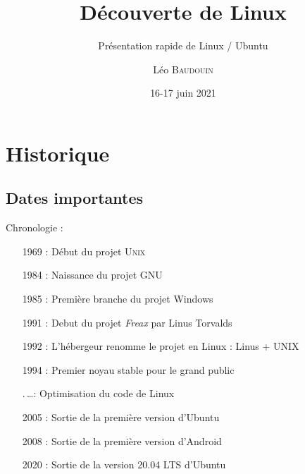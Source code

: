 \documentclass{beamer}
\title[Pr\'esentation Linux]{D\'ecouverte de Linux}
\subtitle{Présentation rapide de Linux / Ubuntu}
\author{L\'eo \textsc{Baudouin}}
\institute{
  {\url{baudouin.leo @ gmail.com}}
}
\date{16-17 juin 2021}
\begin{document}
\begin{frame}
\titlepage
\end{frame}

\begin{frame}
\tableofcontents
\end{frame}


\section{Historique}
\subsection{Dates importantes}
\begin{frame}
  \begin{block}{Chronologie :}
   ~~~~\begin{minipage}{\linewidth}
      \begin{itemize}
      \item[1969 :] Début du projet U\textsc{nix}
      \item[1984 :] Naissance du projet GNU
      \item[1985 :] Première branche du projet Windows
      \item[1991 :] Debut du projet \textit{Freax} par Linus Torvalds
      \item[1992 :] L'h\'ebergeur renomme le projet en Linux : Linus + UNIX
      \item[1994 :] Premier noyau stable pour le grand public
      \item[.\,\dots :] Optimisation du code de Linux
      \item[2005 :] Sortie de la première version d'Ubuntu
      \item[2008 :] Sortie de la première version d'Android
      \item[2020 :] Sortie de la version 20.04 LTS d'Ubuntu
      \end{itemize}
    \end{minipage}
  \end{block}
\end{frame}
\end{document}
